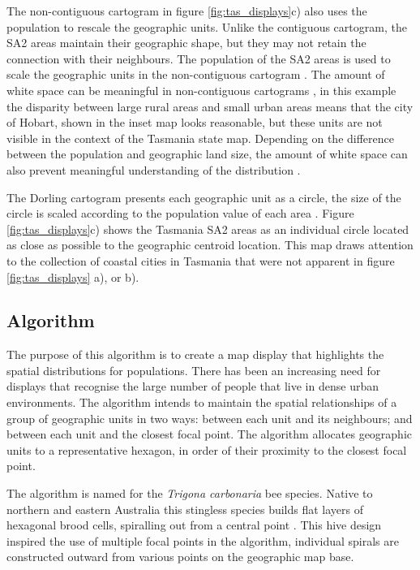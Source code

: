 The non-contiguous cartogram in figure \ref{fig:tas_displays}c) also
uses the population to rescale the geographic units. Unlike the
contiguous cartogram, the SA2 areas maintain their geographic shape, but
they may not retain the connection with their neighbours. The population
of the SA2 areas is used to scale the geographic units in the
non-contiguous cartogram \citep{NAC}. The amount of white space can be
meaningful in non-contiguous cartograms \citep{ECGC}, in this example
the disparity between large rural areas and small urban areas means that
the city of Hobart, shown in the inset map looks reasonable, but these
units are not visible in the context of the Tasmania state map.
Depending on the difference between the population and geographic land
size, the amount of white space can also prevent meaningful
understanding of the distribution \citep{TVSSS}.

The Dorling cartogram presents each geographic unit as a circle, the
size of the circle is scaled according to the population value of each
area \citep{ACTUC}. Figure \ref{fig:tas_displays}c) shows the Tasmania
SA2 areas as an individual circle located as close as possible to the
geographic centroid location. This map draws attention to the collection
of coastal cities in Tasmania that were not apparent in figure
\ref{fig:tas_displays} a), or b).

\hypertarget{algorithm}{%
\subsection{Algorithm}\label{algorithm}}

The purpose of this algorithm is to create a map display that highlights
the spatial distributions for populations. There has been an increasing
need for displays that recognise the large number of people that live in
dense urban environments. The algorithm intends to maintain the spatial
relationships of a group of geographic units in two ways: between each
unit and its neighbours; and between each unit and the closest focal
point. The algorithm allocates geographic units to a representative
hexagon, in order of their proximity to the closest focal point.

The algorithm is named for the \emph{Trigona carbonaria} bee species.
Native to northern and eastern Australia this stingless species builds
flat layers of hexagonal brood cells, spiralling out from a central
point \citep{PH}. This hive design inspired the use of multiple focal
points in the algorithm, individual spirals are constructed outward from
various points on the geographic map base.

